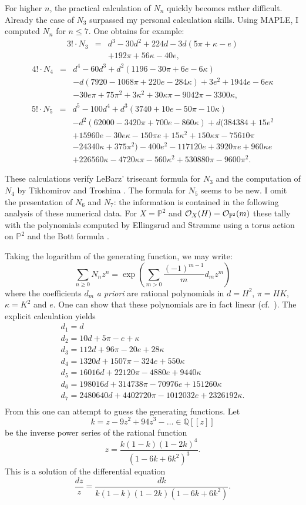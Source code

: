 \documentclass[twoside,11pt]{article}
\newcommand{\ko}{{\cal O}}
\newcommand{\IP}{{\mathbb P}}
\newcommand{\IQ}{{\mathbb Q}}
\begin{document}
For higher $n$, the practical calculation of $N_n$
quickly becomes rather difficult. Already the case of $N_3$
surpassed my personal calculation skills. Using MAPLE, I computed $N_n$ for $n\leq 7$. One obtains for example:
\begin{eqnarray*}3!\cdot N_3&=&d^3-30d^2+224d-3d(5\pi+\kappa-e)\\
&&+192\pi+56\kappa-40e,
\end{eqnarray*}
\begin{eqnarray*}
4!\cdot N_4&=&d^4-60d^3+d^2(1196-30\pi+6e-6\kappa)\\
&&-d(7920-1068\pi+220e-284\kappa)+3e^2+1944e-6e\kappa\\
&&-30e\pi+75\pi^2+3\kappa^2+30\kappa\pi-9042\pi
-3300\kappa,
\end{eqnarray*}
\begin{eqnarray*}5!\cdot N_5&=&
d^5-100d^4+d^3(3740+10e-50\pi-10\kappa)\\
&&-d^2(62000-3420\pi+700e-860\kappa)+d(384384+15e^2\\
&&+15960e-30e\kappa-150\pi e+15\kappa^2+150\kappa\pi-75610\pi\\
&&-24340\kappa+375\pi^2)-400e^2-117120e+3920\pi e+960\kappa e\\
&&+226560\kappa-4720\kappa\pi-560\kappa^2+530880\pi-9600\pi^2.
\end{eqnarray*}

These calculations verify LeBarz' trisecant formula for $N_3$
\cite[Th\'eo\-r\`eme 8]{LeBarz} and the computation of $N_4$ by Tikhomirov and
Troshina \cite{TikhomirovN4}. The formula for $N_5$ seems to be new.
I omit the presentation of $N_6$ and $N_7$: the information is contained in
the following analysis of these numerical data. For $X=\IP^2$ and $\ko_X(H)=\ko_{\IP^2}(m)$ these tally with the polynomials computed by
Ellingsrud and Str\o{}mme using a torus action on $\IP^2$ and the Bott formula \cite{EllStrBott}.

Taking the logarithm of the generating function, we may write:
$$\sum_{n\geq0}N_nz^n=\exp\left(\sum_{m>0}\frac{(-1)^{m-1}}{m}d_mz^m\right)$$
where the coefficients $d_m$ {\sl a priori} are rational polynomials in $d=H^2$, $\pi=HK$, $\kappa=K^2$ and $e$. One can show that these polynomials are in
fact linear (cf.\ \cite{EllingsrudGoettscheLehn}). The explicit calculation yields
$$
\begin{array}{c}
d_1=d\phantom{-\pi-e}\\
d_2=10d+5\pi-e+\kappa\\
d_3=112d+96\pi-20e+28\kappa\\
d_4=1320d+1507\pi-324e+550\kappa\\
d_5=16016d+22120\pi-4880e+9440\kappa\\
d_6=198016d+314738\pi-70976e+151260\kappa\\
d_7=2480640d+4402720\pi-1012032e+2326192\kappa.\\
\end{array}
$$
From this one can attempt to guess the generating functions.
Let
$$k=z-9z^2+94z^3-\ldots\in\IQ[[z]]$$
be the inverse power series of the rational function
$$z=\frac{k(1-k)(1-2k)^4}{(1-6k+6k^2)^3}.$$
This is a solution of the differential equation
$$\frac{dz}{z}=\frac{dk}{k(1-k)(1-2k)(1-6k+6k^2)}.$$
\end{document}
